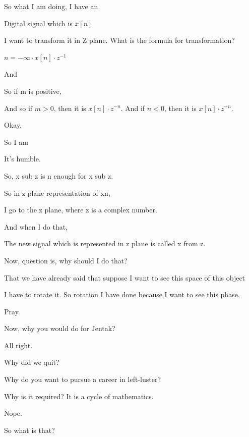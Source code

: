 \documentclass{article}
\begin{document}
So what I am doing, I have an

Digital signal which is $x[n]$



I want to transform it in Z plane. What is the formula for transformation?

$n = -\infty \cdot x[n] \cdot z^{-1}$

And

So if m is positive,

And so if $m > 0$, then it is $x[n] \cdot z^{-n}$. And if $n < 0$, then it is $x[n] \cdot z^{+n}$.

Okay.

So I am

It's humble.

So, x sub z is n enough for x sub z.

So in z plane representation of xn,

I go to the z plane, where z is a complex number.



And when I do that,

The new signal which is represented in z plane is called x from z.

Now, question is, why should I do that?



That we have already said that suppose I want to see this space of this object

I have to rotate it. So rotation I have done because I want to see this phase.

Pray.

Now, why you would do for Jentak?

All right.

Why did we quit?

Why do you want to pursue a career in left-luster?

Why is it required? It is a cycle of mathematics.

Nope.

So what is that?
\end{document}
